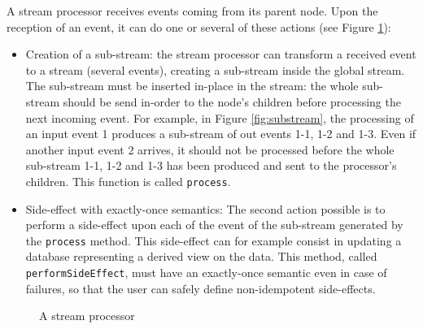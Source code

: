 A stream processor receives events coming from its parent node. Upon the reception of an event, it can do one or several of these
actions (see Figure \ref{fig:streamprocessor}):
\begin{itemize}
  \item Creation of a sub-stream: the stream processor can transform a received event to a stream (several events), creating a sub-stream
  inside the global stream. The sub-stream must be inserted in-place in the stream: the whole sub-stream should be
  send in-order to the node's children before processing the next incoming event. For example, in Figure \ref{fig:substream},
  the processing of an input event 1 produces a sub-stream of out events 1-1, 1-2 and 1-3. Even if another input event 2
  arrives, it should not be processed before the whole sub-stream 1-1, 1-2 and 1-3 has been produced and sent to the processor's 
  children. This function is called \verb|process|.
  \item Side-effect with exactly-once semantics: The second action possible is to perform a side-effect upon each of the event
  of the sub-stream generated by the \verb|process| method. This side-effect can for example consist in updating a database representing
  a derived view on the data. This method, called \verb|performSideEffect|, must have an exactly-once semantic even in case of failures, so that the user
  can safely define non-idempotent side-effects.
\end{itemize}

\begin{figure}[H]
  \begin{center} 
    \caption{A stream processor}
    \label{fig:streamprocessor}
  \end{center}
\end{figure}

